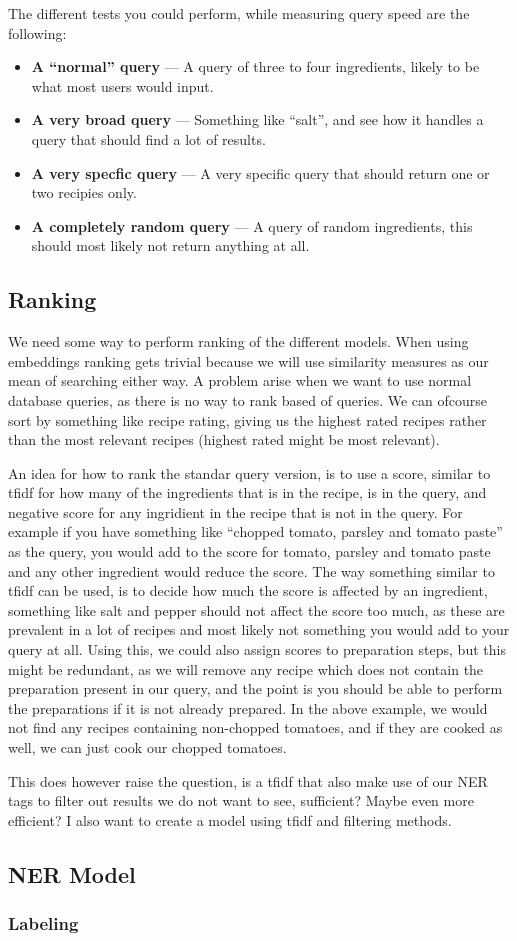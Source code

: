 \documentclass{article}
\begin{document}
The different tests you could perform, while measuring query speed are the
following:
\begin{itemize}
    \item \textbf{A ``normal'' query} --- A query of three to four ingredients,
        likely to be what most users would input.
    \item \textbf{A very broad query} --- Something like ``salt'', and see how it
        handles a query that should find a lot of results.
    \item \textbf{A very specfic query} --- A very specific query that should
        return one or two recipies only.
    \item \textbf{A completely random query} --- A query of random ingredients,
        this should most likely not return anything at all.
\end{itemize}

\subsection{Ranking}
We need some way to perform ranking of the different models.
When using embeddings ranking gets trivial because we will use similarity
measures as our mean of searching either way.
A problem arise when we want to use normal database queries, as there is no way
to rank based of queries.
We can ofcourse sort by something like recipe rating, giving us the highest
rated recipes rather than the most relevant recipes (highest rated might be most
relevant).

An idea for how to rank the standar query version, is to use a score, similar to
tfidf for how many of the ingredients that is in the recipe, is in the query,
and negative score for any ingridient in the recipe that is not in the query.
For example if you have something like ``chopped tomato, parsley and tomato
paste'' as the query, you would add to the score for tomato, parsley and tomato
paste and any other ingredient would reduce the score.
The way something similar to tfidf can be used, is to decide how much the score
is affected by an ingredient, something like salt and pepper should not affect
the score too much, as these are prevalent in a lot of recipes and most likely
not something you would add to your query at all.
Using this, we could also assign scores to preparation steps, but this might be
redundant, as we will remove any recipe which does not contain the preparation
present in our query, and the point is you should be able to perform the
preparations if it is not already prepared.
In the above example, we would not find any recipes containing non-chopped
tomatoes, and if they are cooked as well, we can just cook our chopped tomatoes.

This does however raise the question, is a tfidf that also make use of our NER
tags to filter out results we do not want to see, sufficient? Maybe even more
efficient?
I also want to create a model using tfidf and filtering methods.
\subsection{NER Model}
\subsubsection{Labeling}
\end{document}
